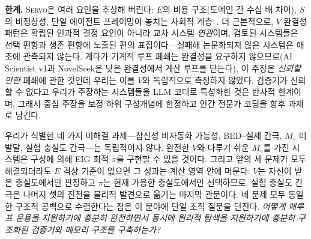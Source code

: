 \documentclass[11pt]{article}
\newcommand{\framework}{\textsc{Servo}}
\begin{document}
\noindent\textbf{한계.} \framework{}은 여러 요인을 추상해 버린다: $E$의 비용 구조(도메인 간 수십 배 차이), $S$의 비정상성, 단일 에이전트 프레이밍이 놓치는 사회적 계층~\citep{taniguchi2024cpc}. 더 근본적으로, $V$ 완결성 패턴은 확립된 인과적 결정 요인이 아니라 교차 시스템 \emph{연관}이며, 검토된 시스템들은 선택 편향과 생존 편향에 노출된 편의 표집이다---실패해 논문화되지 않은 시스템은 애초에 관측되지 않는다. 게다가 기계적 루프 폐쇄는 완결성을 요구하지 않으므로(AI Scientist v1과 NovelSeek은 낮은 완결성에서 계산 루프를 닫는다), 이 주장은 \emph{신뢰할 만한} 폐쇄에 관한 것인데 우리는 이를 $V$와 독립적으로 측정하지 않았다. 검증기가 신뢰할 수 없다고 우리가 주장하는 시스템들을 LLM 코더로 특성화한 것은 반사적 한계이며, 그래서 중심 주장을 보정 하위 구성개념에 한정하고 인간 전문가 코딩을 향후 과제로 남긴다.

우리가 식별한 네 가지 미해결 과제---참신성 비자동화 가능성, BED--실제 간극, $M_s$ 미발달, 실험 충실도 간극---는 독립적이지 않다. 완전한 $V$와 다루기 쉬운 $M_s$를 가진 시스템은 구성에 의해 EIG 최적 $\pi$를 구현할 수 있을 것이다. 그리고 앞의 세 문제가 모두 해결되더라도 $E$ 격상 기준이 없으면 그 성과는 계산 영역 안에 머문다: $V$는 자신이 받은 충실도에서만 판정하고 $\pi$는 현재 가용한 충실도에서만 선택하므로, 실험 충실도 간극은 나머지 셋의 진전을 물리적 발견으로 옮기는 마지막 관문이다. 네 문제 모두 동일한 구조적 공백으로 수렴한다는 점은 이 분야에 단일 조직 질문을 던진다. \textit{어떻게 폐루프 운용을 지원하기에 충분히 완전하면서 동시에 원리적 탐색을 지원하기에 충분히 구조화된 검증기와 메모리 구조를 구축하는가?}



\end{document}
